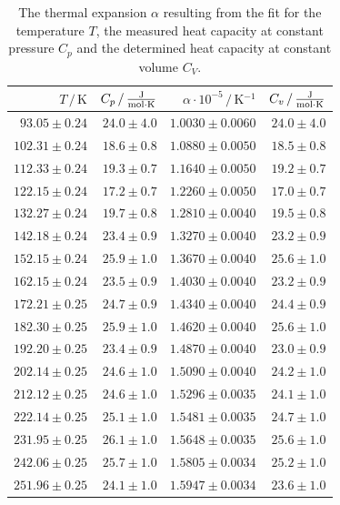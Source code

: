 \begin{table}
    \centering
    \caption{The thermal expansion $\alpha$ resulting from the fit for the temperature $T$, the measured heat capacity at constant pressure $C_p$ and the determined heat capacity at constant volume $C_V$.}
    \label{tab:C_v}
    \begin{tabular}{r r r r}
        \toprule
        $T \,/\, \unit{\kelvin}$ & $C_p \,/\, \unit{\frac{\joule}{\mol \cdot \kelvin}}$ & $\alpha \cdot 10^{-5} \,/\, \unit{\kelvin^{-1}}$ & $C_v \,/\, \unit{\frac{\joule}{\mol \cdot \kelvin}}$\\
        \midrule
        $93.05\pm0.24$ & $24.0\pm4.0$ & $1.0030\pm0.0060$ & $24.0\pm4.0$ \\
        $102.31\pm0.24$ & $18.6\pm0.8$ & $1.0880\pm0.0050$ & $18.5\pm0.8$ \\
        $112.33\pm0.24$ & $19.3\pm0.7$ & $1.1640\pm0.0050$ & $19.2\pm0.7$ \\
        $122.15\pm0.24$ & $17.2\pm0.7$ & $1.2260\pm0.0050$ & $17.0\pm0.7$ \\
        $132.27\pm0.24$ & $19.7\pm0.8$ & $1.2810\pm0.0040$ & $19.5\pm0.8$ \\
        $142.18\pm0.24$ & $23.4\pm0.9$ & $1.3270\pm0.0040$ & $23.2\pm0.9$ \\
        $152.15\pm0.24$ & $25.9\pm1.0$ & $1.3670\pm0.0040$ & $25.6\pm1.0$ \\
        $162.15\pm0.24$ & $23.5\pm0.9$ & $1.4030\pm0.0040$ & $23.2\pm0.9$ \\
        $172.21\pm0.25$ & $24.7\pm0.9$ & $1.4340\pm0.0040$ & $24.4\pm0.9$ \\
        $182.30\pm0.25$ & $25.9\pm1.0$ & $1.4620\pm0.0040$ & $25.6\pm1.0$ \\
        $192.20\pm0.25$ & $23.4\pm0.9$ & $1.4870\pm0.0040$ & $23.0\pm0.9$ \\
        $202.14\pm0.25$ & $24.6\pm1.0$ & $1.5090\pm0.0040$ & $24.2\pm1.0$ \\
        $212.12\pm0.25$ & $24.6\pm1.0$ & $1.5296\pm0.0035$ & $24.1\pm1.0$ \\
        $222.14\pm0.25$ & $25.1\pm1.0$ & $1.5481\pm0.0035$ & $24.7\pm1.0$ \\
        $231.95\pm0.25$ & $26.1\pm1.0$ & $1.5648\pm0.0035$ & $25.6\pm1.0$ \\
        $242.06\pm0.25$ & $25.7\pm1.0$ & $1.5805\pm0.0034$ & $25.2\pm1.0$ \\
        $251.96\pm0.25$ & $24.1\pm1.0$ & $1.5947\pm0.0034$ & $23.6\pm1.0$ \\

\end{tabular}
\end{table}
